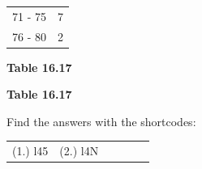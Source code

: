 \begin{description}[noitemsep]
\begin{description}[noitemsep]
\begin{enumerate}[noitemsep, label=\textbf{\arabic*}. ]
\begin{table}[H]
\begin{center}
\begin{xtabular}[t]{|l|l|}
        71 - 75 &
        7%
     \tabularnewline{}
        76 - 80 &
        2%
     \tabularnewline{}
    \end{xtabular}
      \end{center}
    \begin{center}{\small\bfseries Table 16.17}\end{center}
    \begin{caption}{\small\bfseries Table 16.17}\end{caption}
\end{table}
    \par
          \end{enumerate}
  \label{m39400**end}
\par {} Find the answers with the shortcodes:
 \par \begin{tabular}[h]{cccccc}
 (1.) l45  &  (2.) l4N  & \end{tabular}
%     
%     
%     

\end{description}
\end{description}
